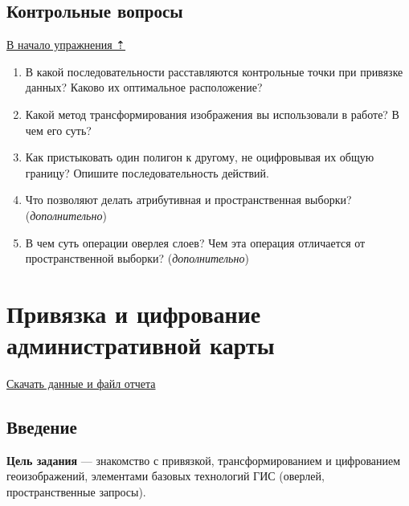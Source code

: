 \documentclass[12pt,]{book}
\begin{document}
\hypertarget{map-ref-hydrogeologic-questions}{%
\section{Контрольные вопросы}\label{map-ref-hydrogeologic-questions}}

\protect\hyperlink{map-ref-hydrogeologic}{В начало упражнения ⇡}

\begin{enumerate}
\def\labelenumi{\arabic{enumi}.}
\item
  В какой последовательности расставляются контрольные точки при привязке данных? Каково их оптимальное расположение?
\item
  Какой метод трансформирования изображения вы использовали в работе? В чем его суть?
\item
  Как пристыковать один полигон к другому, не оцифровывая их общую границу? Опишите последовательность действий.
\item
  Что позволяют делать атрибутивная и пространственная выборки? (\emph{дополнительно})
\item
  В чем суть операции оверлея слоев? Чем эта операция отличается от пространственной выборки? (\emph{дополнительно})
\end{enumerate}

\hypertarget{map-ref-economic}{%
\chapter{Привязка и цифрование административной карты}\label{map-ref-economic}}

\href{http://autolab.geogr.msu.ru/gis/data/Ex07.zip}{Скачать данные и файл отчета}

\hypertarget{map-ref-economic-intro}{%
\section{Введение}\label{map-ref-economic-intro}}

\textbf{Цель задания} --- знакомство с привязкой, трансформированием и цифрованием геоизображений, элементами базовых технологий ГИС (оверлей, пространственные запросы).
\end{document}
